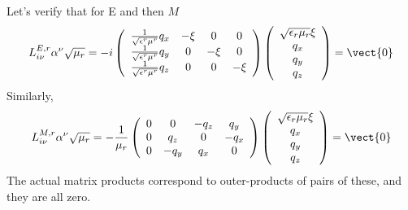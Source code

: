 Let's verify that for E and then $M$
\begin{align}
  L^{E,r}_{i\nu}\alpha^\nu\sqrt{\mu_r} = -i\left( \begin{array}{cccc} 
      \frac{1}{\sqrt{\epsilon^r\mu^r}}q_x & -\xi & 0 & 0\\
      \frac{1}{\sqrt{\epsilon^r\mu^r}}q_y & 0 &-\xi & 0\\
      \frac{1}{\sqrt{\epsilon^r\mu^r}}q_z & 0 & 0 & -\xi
    \end{array}
  \right)
  \left(\begin{array}{c}
      \sqrt{\epsilon_r\mu_r} \xi \\        q_x \\        q_y\\        q_z
      \end{array}
    \right) = \vect{0}
  \end{align}
Similarly,
\begin{align}
  L^{M,r}_{i\nu}\alpha^\nu\sqrt{\mu_r} = -
   \frac{1}{\mu_r}\left( \begin{array}{cccc} 
      0 & 0 & -q_z & q_y\\
      0 & q_z & 0 & -q_x\\
      0 & -q_y & q_x & 0
    \end{array}
  \right)
  \left(\begin{array}{c}
      \sqrt{\epsilon_r\mu_r} \xi \\        q_x \\        q_y\\        q_z
      \end{array}
    \right) = \vect{0}
  \end{align}
The actual matrix products correspond to outer-products of pairs of these, and they are all zero.

